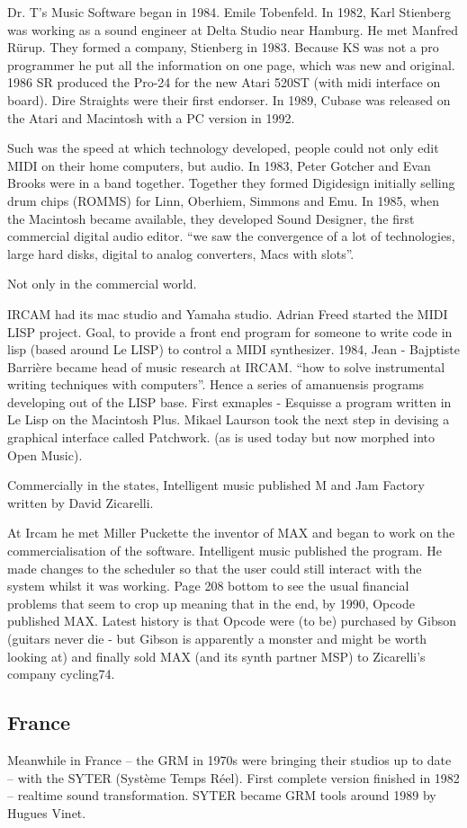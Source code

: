 Dr. T's Music Software began in 1984. Emile Tobenfeld. In 1982, Karl Stienberg was working as a sound engineer at Delta Studio near Hamburg.  He met Manfred R\"urup.  They formed a company, Stienberg in 1983.  Because KS was not a pro programmer he put all the information  on one page, which was new and original. 1986 SR produced the Pro-24 for the new Atari 520ST (with midi interface on board).  Dire Straights were their first endorser. In 1989, Cubase was released on the Atari and Macintosh with a PC version in 1992.  

Such was the speed at which technology developed, people could not only edit MIDI on their home computers, but audio. In 1983, Peter Gotcher and Evan Brooks were in a band together. Together they formed Digidesign initially selling drum chips (ROMMS) for Linn, Oberhiem, Simmons and Emu. In 1985, when the Macintosh became available, they developed Sound Designer, the first commercial digital audio editor.  ``we saw the convergence of a lot of technologies, large hard disks, digital to analog converters, Macs with slots''.

Not only in the commercial world.

 IRCAM had its mac studio and Yamaha studio.  Adrian Freed started the MIDI LISP project.  Goal, to provide a front end program for someone to write code in lisp (based around Le LISP) to control a MIDI synthesizer. 1984, Jean - Bajptiste Barri\`ere became head of music research at IRCAM.  ``how to solve instrumental writing techniques with computers''.  Hence a series of amanuensis programs developing out of the LISP base.   First exmaples - Esquisse a program written in Le Lisp on the Macintosh Plus. Mikael Laurson took the next step in devising a graphical interface called Patchwork. (as is used today but now morphed into Open Music).   

Commercially in the states, Intelligent music published M and Jam Factory written by David Zicarelli.
   
At Ircam he met Miller Puckette the inventor of MAX and began to work on the commercialisation of the software.  Intelligent music published the program.  He made changes to the scheduler so that the user could still interact with the system whilst it was working.  Page 208 bottom to see the usual financial problems that seem to crop up meaning that in the end, by 1990, Opcode published MAX.  Latest history is that Opcode were (to be) purchased by Gibson (guitars never die - but Gibson is apparently a monster and might be worth looking at) and finally sold MAX (and its synth partner MSP) to Zicarelli's company cycling74.

\subsection{France}
Meanwhile in France – the GRM in 1970s were bringing their studios up to date – with the SYTER (Syst\`eme Temps R\'eel). First complete version finished in 1982 – realtime sound transformation. SYTER became GRM tools around 1989 by Hugues Vinet.



